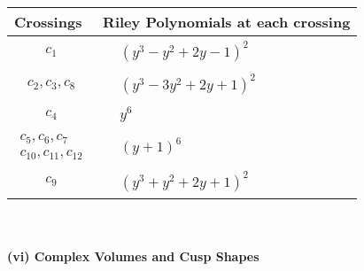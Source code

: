 \documentclass[1p]{elsarticle_modified}
\theoremstyle{definition}
\begin{document}
\begin{tabular}{m{50pt}|m{274pt}}
Crossings & \hspace{64pt}Riley Polynomials at each crossing \\
\hline $$\begin{aligned}c_{1}\end{aligned}$$&$\begin{aligned}
&(y^3- y^2+2 y-1)^2
\end{aligned}$\\
\hline $$\begin{aligned}c_{2},c_{3},c_{8}\end{aligned}$$&$\begin{aligned}
&(y^3-3 y^2+2 y+1)^2
\end{aligned}$\\
\hline $$\begin{aligned}c_{4}\end{aligned}$$&$\begin{aligned}
&y^6
\end{aligned}$\\
\hline $$\begin{aligned}c_{5},c_{6},c_{7}\\c_{10},c_{11},c_{12}\end{aligned}$$&$\begin{aligned}
&(y+1)^6
\end{aligned}$\\
\hline $$\begin{aligned}c_{9}\end{aligned}$$&$\begin{aligned}
&(y^3+y^2+2 y+1)^2
\end{aligned}$\\
\hline
\end{tabular}\\~\\
\newpage\flushleft \textbf{(vi) Complex Volumes and Cusp Shapes}
\end{document}
